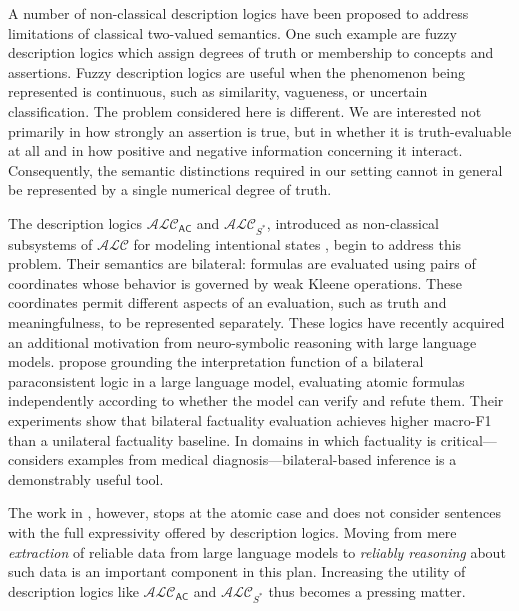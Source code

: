 \documentclass[letterpaper]{article} %
\theoremstyle{definition}
\theoremstyle{definition}
\theoremstyle{definition}
\theoremstyle{definition}
\theoremstyle{definition}
\begin{document}
A number of non-classical description logics have been proposed to address limitations of classical two-valued semantics. One such example are fuzzy description logics \cite{DBLP:conf/aaai/Straccia98,DBLP:conf/sum/BorgwardtP17} which assign degrees of truth or membership to concepts and assertions. Fuzzy description logics are useful when the phenomenon being represented is continuous, such as similarity, vagueness, or uncertain classification. The problem considered here is different. We are interested not primarily in how strongly an assertion is true, but in whether it is truth-evaluable at all and in how positive and negative information concerning it interact. Consequently, the semantic distinctions required in our setting cannot in general be represented by a single numerical degree of truth.

The description logics $\mathcal{ALC}_\mathsf{AC}$ and $\mathcal{ALC}_{S^\ast}$, introduced as non-classical subsystems of $\mathcal{ALC}$ for modeling intentional states \cite{DBLP:conf/dlog/Ferguson21}, begin to address this problem. Their semantics are bilateral: formulas are evaluated using pairs of coordinates whose behavior is governed by weak Kleene operations. These coordinates permit different aspects of an evaluation, such as truth and meaningfulness, to be represented separately. These logics have recently acquired an additional motivation from neuro-symbolic reasoning with large language models. \cite{DBLP:conf/nesy/AllenCFIG25} propose grounding the interpretation function of a bilateral paraconsistent logic in a large language model, evaluating atomic formulas independently according to whether the model can verify and refute them. Their experiments show that bilateral factuality evaluation achieves higher macro-F1 than a unilateral factuality baseline. In domains in which factuality is critical---\cite{DBLP:conf/nesy/AllenCFIG25} considers examples from medical diagnosis---bilateral-based inference is a demonstrably useful tool.

The work in \cite{DBLP:conf/nesy/AllenCFIG25}, however, stops at the atomic case and does not consider sentences with the full expressivity offered by description logics. Moving from mere \emph{extraction} of reliable data from large language models to \emph{reliably reasoning} about such data is an important component in this plan. Increasing the utility of description logics like $\mathcal{ALC}_\mathsf{AC}$ and $\mathcal{ALC}_{S^\ast}$ thus becomes a pressing matter. 


\end{document}
